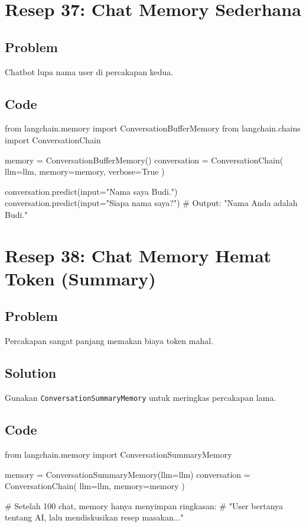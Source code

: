 \newpage

\section{Resep 37: Chat Memory Sederhana}

\subsection*{Problem}
Chatbot lupa nama user di percakapan kedua.

\subsection*{Code}
\begin{codeblock}[language=Python]
from langchain.memory import ConversationBufferMemory
from langchain.chains import ConversationChain

memory = ConversationBufferMemory()
conversation = ConversationChain(
    llm=llm,
    memory=memory,
    verbose=True
)

conversation.predict(input="Nama saya Budi.")
conversation.predict(input="Siapa nama saya?")
# Output: "Nama Anda adalah Budi."
\end{codeblock}

\newpage

\section{Resep 38: Chat Memory Hemat Token (Summary)}

\subsection*{Problem}
Percakapan sangat panjang memakan biaya token mahal.

\subsection*{Solution}
Gunakan \texttt{ConversationSummaryMemory} untuk meringkas percakapan lama.

\subsection*{Code}
\begin{codeblock}[language=Python]
from langchain.memory import ConversationSummaryMemory

memory = ConversationSummaryMemory(llm=llm)
conversation = ConversationChain(
    llm=llm,
    memory=memory
)

# Setelah 100 chat, memory hanya menyimpan ringkasan:
# "User bertanya tentang AI, lalu mendiskusikan resep masakan..."
\end{codeblock}

